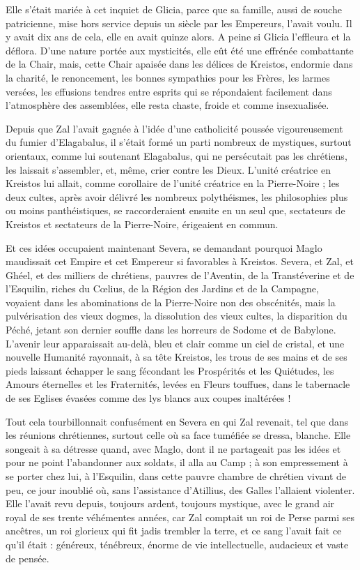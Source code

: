\documentclass[a4paper, 11pt, oneside, polutonikogreek, french]{article}
\begin{document}
Elle s'était mariée à cet inquiet de Glicia, parce que sa famille, aussi de souche patricienne, mise hors service depuis un siècle par les Empereurs, l'avait voulu. Il y avait dix ans de cela, elle en avait quinze alors. A peine si Glicia l'effleura et la déflora. D'une nature portée aux mysticités, elle eût été une effrénée combattante de la Chair, mais, cette Chair apaisée dans les délices de Kreistos, endormie dans la charité, le renoncement, les bonnes sympathies pour les Frères, les larmes versées, les effusions tendres entre esprits qui se répondaient facilement dans l'atmosphère des assemblées, elle resta chaste, froide et comme insexualisée.

Depuis que Zal l'avait gagnée à l'idée d'une catholicité poussée vigoureusement du fumier d'Elagabalus, il s'était formé un parti nombreux de mystiques, surtout orientaux, comme lui soutenant Elagabalus, qui ne persécutait pas les chrétiens, les laissait s'assembler, et, même, crier contre les Dieux. L'unité créatrice en Kreistos lui allait, comme corollaire de l'unité créatrice en la Pierre-Noire ; les deux cultes, après avoir délivré les nombreux polythéismes, les philosophies plus ou moins panthéistiques, se raccorderaient ensuite en un seul que, sectateurs de Kreistos et sectateurs de la Pierre-Noire, érigeaient en commun.

Et ces idées occupaient maintenant Severa, se demandant pourquoi Maglo maudissait cet Empire et cet Empereur si favorables à Kreistos. Severa, et Zal, et Ghéel, et des milliers de chrétiens, pauvres de l'Aventin, de la Transtéverine et de l'Esquilin, riches du Cœlius, de la Région des Jardins et de la Campagne, voyaient dans les abominations de la Pierre-Noire non des obscénités, mais la pulvérisation des vieux dogmes, la dissolution des vieux cultes, la disparition du Péché, jetant son dernier souffle dans les horreurs de Sodome et de Babylone. L'avenir leur apparaissait au-delà, bleu et clair comme un ciel de cristal, et une nouvelle Humanité rayonnait, à sa tête Kreistos, les trous de ses mains et de ses pieds laissant échapper le sang fécondant les Prospérités et les Quiétudes, les Amours éternelles et les Fraternités, levées en Fleurs touffues, dans le tabernacle de ses Eglises évasées comme des lys blancs aux coupes inaltérées !

Tout cela tourbillonnait confusément en Severa en qui Zal revenait, tel que dans les réunions chrétiennes, surtout celle où sa face tuméfiée se dressa, blanche. Elle songeait à sa détresse quand, avec Maglo, dont il ne partageait pas les idées et pour ne point l'abandonner aux soldats, il alla au Camp ; à son empressement à se porter chez lui, à l'Esquilin, dans cette pauvre chambre de chrétien vivant de peu, ce jour inoublié où, sans l'assistance d'Atillius, des Galles l'allaient violenter. Elle l'avait revu depuis, toujours ardent, toujours mystique, avec le grand air royal de ses trente véhémentes années, car Zal comptait un roi de Perse parmi ses ancêtres, un roi glorieux qui fit jadis trembler la terre, et ce sang l'avait fait ce qu'il était : généreux, ténébreux, énorme de vie intellectuelle, audacieux et vaste de pensée.
\end{document}
